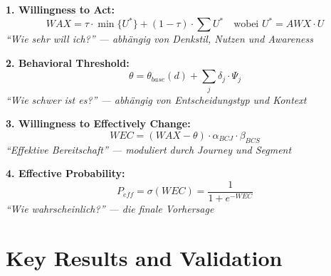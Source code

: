 \begin{tcolorbox}[
  title={\textbf{EBF: Die 4 Kernformeln}},
  colback=blue!3,
  colframe=blue!50!black,
  fonttitle=\bfseries\sffamily
]

\textbf{1. Willingness to Act:}
\begin{equation*}
WAX = \tau \cdot \min\{U^*\} + (1-\tau) \cdot \sum U^* \quad \text{wobei } U^* = AWX \cdot U
\end{equation*}
\textit{``Wie sehr will ich?'' --- abhängig von Denkstil, Nutzen und Awareness}

\vspace{6pt}
\textbf{2. Behavioral Threshold:}
\begin{equation*}
\theta = \theta_{base}(d) + \sum_j \delta_j \cdot \Psi_j
\end{equation*}
\textit{``Wie schwer ist es?'' --- abhängig von Entscheidungstyp und Kontext}

\vspace{6pt}
\textbf{3. Willingness to Effectively Change:}
\begin{equation*}
WEC = (WAX - \theta) \cdot \alpha_{BCJ} \cdot \beta_{BCS}
\end{equation*}
\textit{``Effektive Bereitschaft'' --- moduliert durch Journey und Segment}

\vspace{6pt}
\textbf{4. Effective Probability:}
\begin{equation*}
P_{eff} = \sigma(WEC) = \frac{1}{1 + e^{-WEC}}
\end{equation*}
\textit{``Wie wahrscheinlich?'' --- die finale Vorhersage}

\end{tcolorbox}




\section{Key Results and Validation}
\label{sec:av-results}

